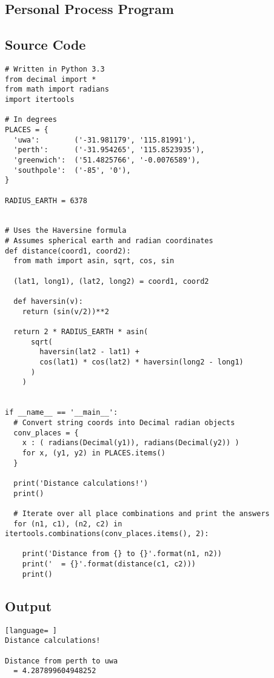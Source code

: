 \documentclass[a4paper,10pt]{article}
\begin{document}
\clearpage
\begin{appendices}
 \section{Personal Process Program}
 
 \subsection{Source Code}
 \begin{lstlisting}
# Written in Python 3.3
from decimal import *
from math import radians
import itertools

# In degrees
PLACES = {
  'uwa':        ('-31.981179', '115.81991'),
  'perth':      ('-31.954265', '115.8523935'),
  'greenwich':  ('51.4825766', '-0.0076589'),
  'southpole':  ('-85', '0'),
}

RADIUS_EARTH = 6378


# Uses the Haversine formula
# Assumes spherical earth and radian coordinates
def distance(coord1, coord2):
  from math import asin, sqrt, cos, sin

  (lat1, long1), (lat2, long2) = coord1, coord2

  def haversin(v):
    return (sin(v/2))**2

  return 2 * RADIUS_EARTH * asin(
      sqrt(
        haversin(lat2 - lat1) + 
        cos(lat1) * cos(lat2) * haversin(long2 - long1)
      )
    )


if __name__ == '__main__':
  # Convert string coords into Decimal radian objects
  conv_places = {
    x : ( radians(Decimal(y1)), radians(Decimal(y2)) ) 
    for x, (y1, y2) in PLACES.items()
  }

  print('Distance calculations!')
  print()

  # Iterate over all place combinations and print the answers
  for (n1, c1), (n2, c2) in itertools.combinations(conv_places.items(), 2):

    print('Distance from {} to {}'.format(n1, n2))
    print('  = {}'.format(distance(c1, c2)))
    print()
 \end{lstlisting}

 \newpage
 \subsection{Output}
 \begin{lstlisting}[language= ]
Distance calculations!

Distance from perth to uwa
  = 4.287899604948252


\end{lstlisting}
\end{appendices}
\end{document}
